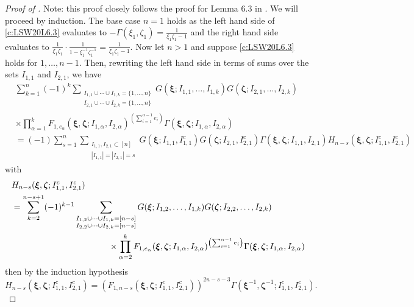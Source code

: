 \documentclass[a4paper,11pt]{article}
\theoremstyle{definition}
\begin{document}
\begin{proof}[Proof of ]
    Note: this proof closely follows the proof for Lemma 6.3 in \cite{liu_integral_2020}. We will proceed by induction. The base case $n=1$ holds as the left hand side of \eqref{c:LSW20L6.3} evaluates to $-\Gamma(\xi_1,\zeta_1)=\frac{1}{\xi_1\zeta_1-1}$ and the right hand side evaluates to $\frac{1}{\xi_1\zeta_1}\cdot \frac{1}{1-\xi_1^{-1}\zeta_1^{-1}} = \frac{1}{\xi_1\zeta_1-1}$. Now let $n>1$ and suppose \eqref{c:LSW20L6.3} holds for $1, \ldots,n-1$. Then, rewriting the left hand side in terms of sums over the sets $I_{1,1}$ and $I_{2,1}$, we have 
    \begin{equation}\label{e:inductionproofeq}
    \begin{split}
    &\sum_{k=1}^n(-1)^k\sum_{\substack{I_{1,1}\cup\cdots\cup I_{1,k}=\{1,\ldots,n\}\\I_{2,1}\cup\cdots\cup I_{2,k}=\{1,\ldots,n\}}} G(\boldsymbol{\xi};I_{1,1},\ldots,I_{1,k})G(\boldsymbol{\zeta};I_{2,1},\ldots,I_{2,k})\\&\times\prod_{\alpha=1}^kF_{1,e_{\alpha}}(\boldsymbol{\xi},\boldsymbol{\zeta};I_{1,\alpha}, I_{2,\alpha})^{\left(\sum_{i=1}^{\alpha-1}e_i \right)}\Gamma(\boldsymbol{\xi},\boldsymbol{\zeta}; I_{1, \alpha}, I_{2, \alpha})\\
    &=(-1)\sum_{s=1}^n\sum_{\substack{I_{1,1},I_{2,1}\subset[n]\\|I_{1,1}|=|I_{2,1}|=s}}G(\boldsymbol{\xi};I_{1,1},I_{1,1}^c)G(\boldsymbol{\zeta};I_{2,1},I_{2,1}^c)\Gamma(\boldsymbol{\xi},\boldsymbol{\zeta};I_{1,1},I_{2,1})H_{n-s}(\boldsymbol{\xi},\boldsymbol{\zeta};I_{1,1}^c,I_{2,1}^c)
    \end{split}
    \end{equation}
    with 
    \begin{equation}
    \begin{split}
        &H_{n-s}(\boldsymbol{\xi},\boldsymbol{\zeta};I_{1,1}^c,I_{2,1}^c)\\
        &=\sum_{k=2}^{n-s+1}(-1)^{k-1}\sum_{\substack{I_{1,2}\cup\cdots\cup I_{1,k}=[n-s]\\I_{2,2}\cup\cdots\cup I_{2,k}=[n-s]}}G(\boldsymbol{\xi};I_{1,2},\ldots,I_{1,k})G(\boldsymbol{\zeta};I_{2,2},\ldots,I_{2,k}) \\
        &\hspace{40mm}\times\prod_{\alpha=2}^k F_{1,e_\alpha}(\boldsymbol{\xi},\boldsymbol{\zeta};I_{1,\alpha},I_{2,\alpha})^{\left(\sum_{i=1}^{\alpha-1}e_i\right)}\Gamma(\boldsymbol{\xi},\boldsymbol{\zeta};I_{1,\alpha},I_{2,\alpha})
    \end{split}
    \end{equation}
    then by the induction hypothesis 
    \begin{equation}
        H_{n-s}(\boldsymbol{\xi},\boldsymbol{\zeta};I_{1,1}^c,I_{2,1}^c)=\left(F_{1,n-s}(\boldsymbol{\xi},\boldsymbol{\zeta};I_{1,1}^c,I_{2,1}^c)\right)^{2n-s-3} \Gamma(\boldsymbol{\xi}^{-1},\boldsymbol{\zeta}^{-1};I_{1,1}^c,I_{2,1}^c).
    \end{equation}



\end{proof}
\end{document}
